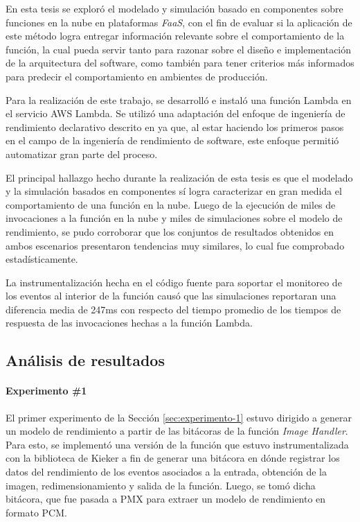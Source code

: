 En esta tesis se exploró el modelado y simulación basado en componentes sobre funciones en la nube en plataformas \emph{FaaS}, con el fin de evaluar si la aplicación de este método logra entregar información relevante sobre el comportamiento de la función, la cual pueda servir tanto para razonar sobre el diseño e implementación de la arquitectura del software, como también para tener criterios más informados para predecir el comportamiento en ambientes de producción.

Para la realización de este trabajo, se desarrolló e instaló una función Lambda en el servicio AWS Lambda.  Se utilizó una adaptación del enfoque de ingeniería de rendimiento declarativo descrito en \cite{Walter:2018:TDP:3185768.3185777} ya que, al estar haciendo los primeros pasos en el campo de la ingeniería de rendimiento de software, este enfoque permitió automatizar gran parte del proceso.

El principal hallazgo hecho durante la realización de esta tesis es que el modelado y la simulación basados en componentes sí logra caracterizar en gran medida el comportamiento de una función en la nube. Luego de la ejecución de miles de invocaciones a la función en la nube y miles de simulaciones sobre el modelo de rendimiento, se pudo corroborar que los conjuntos de resultados obtenidos en ambos escenarios presentaron tendencias muy similares, lo cual fue comprobado estadísticamente. 

La instrumentalización hecha en el código fuente para soportar el monitoreo de los eventos al interior de la función causó que las simulaciones reportaran una diferencia media de 247ms con respecto del tiempo promedio de los tiempos de respuesta de las invocaciones hechas a la función Lambda.

\subsection{Análisis de resultados}
\paragraph{Experimento \#1} El primer experimento de la Sección \ref{sec:experimento-1} estuvo dirigido a generar un modelo de rendimiento a partir de las bitácoras de la función \emph{Image Handler}. Para esto, se implementó una versión de la función que estuvo instrumentalizada con la biblioteca de Kieker a fin de generar una bitácora en dónde registrar los datos del rendimiento de los eventos asociados a la entrada, obtención de la imagen, redimensionamiento y salida de la función. Luego, se tomó dicha bitácora, que fue pasada a PMX para extraer un modelo de rendimiento en formato PCM. 

